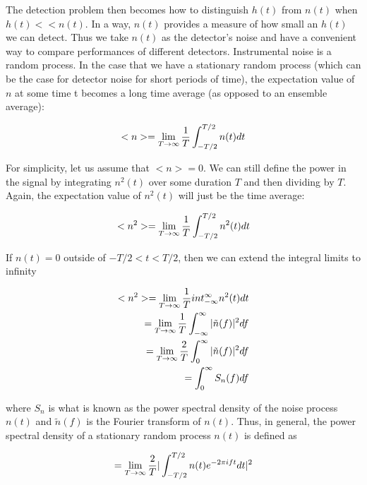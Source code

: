 \documentclass[binding=0.6cm, LaM]{sapthesis}
\begin{document}
	The detection problem then becomes how to distinguish $h(t)$ from $n(t)$ when $h(t) << n(t)$. 
	In a way, $n(t)$ provides a measure of how small an $h(t)$ we can detect. 
	Thus we take $n(t)$ as the detector’s noise and have a convenient way to 
	compare performances of different detectors. 
	Instrumental noise is a random process. In the case that we have a stationary 
	random process (which can be the case for detector noise for short periods of time), 
	the expectation value of $n$ at some time t becomes a long time average (as opposed to an ensemble average):

		\begin{equation}
		<n> = \lim_{T \to \infty} {1 \over T} \int^{T/2}_{-T/2}n(t)dt
		\end{equation}

	For simplicity, let us assume that $<n> = 0$. We can still define the power in the signal by 
	integrating $n^2(t)$ over some duration $T$ and then dividing by $T$. 
	Again, the expectation value of $n^2(t)$ will just be the time average:

		\begin{equation}
		<n^2> = \lim_{T \to \infty} {1 \over T} \int^{T/2}_{-T/2}n^2(t)dt
		\end{equation}

	If $n(t) = 0$ outside of $−T/2 < t < T/2$, then we can extend the integral limits to infinity
	
		\begin{equation}
		\begin{split}
  		<n^2>  = \lim_{T \to \infty}{1 \over T}int^{\infty}_{-\infty}n^2(t) dt \\
         	       = \lim_{T \to \infty}{1 \over T} \int^{\infty}_{-\infty}|\tilde{n}(f)|^2df \\ 
                       = \lim_{T \to \infty}{2 \over T} \int^{\infty}_{0}|\tilde{n}(f)|^2df \\
                       = \int^{\infty}_{0}S_n(f)df
		\end{split}
		\end{equation}

	where $S_n$ is what is known as the power spectral density of the noise process $n(t)$ 
	and $\tilde{n}(f)$ is the Fourier transform of $n(t)$. 
	Thus, in general, the power spectral density of a stationary random process $n(t)$ is defined as

		\begin{equation}
		= \lim_{T \to \infty}{2 \over T} |\int^{T/2}_{-T/2}n(t)e^{-2\pi ift}dt|^2
		\end{equation}
\end{document}
